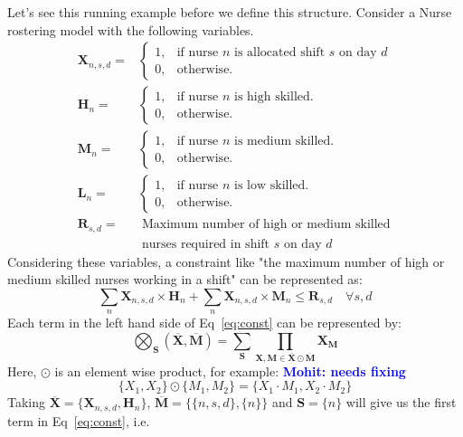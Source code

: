 \documentclass{article}
\newcommand{\mohit}[1]{{\bf \textcolor{blue}{{Mohit: #1}}}}
\newcommand{\TX}{\textbf{X}\xspace}
\newcommand{\TM}{\textbf{M}\xspace}
\begin{document}
Let's see this running example before we define this structure. Consider a Nurse rostering model with the following variables.
%
\begin{align*}
  \TX_{n,s,d} = & \begin{cases}
    1, & \text{if nurse $n$ is allocated shift $s$ on day $d$}\\
    0, & \text{otherwise}.
  \end{cases}\\
  \textbf{H}_{n} = & \begin{cases}
    1, & \text{if nurse $n$ is high skilled}.\\
    0, & \text{otherwise}.
  \end{cases}\\
  \textbf{M}_{n} = & \begin{cases}
    1, & \text{if nurse $n$ is medium skilled}.\\
    0, & \text{otherwise}.
  \end{cases}\\
  \textbf{L}_{n} = & \begin{cases}
    1, & \text{if nurse $n$ is low skilled}.\\
    0, & \text{otherwise}.
  \end{cases}\\
  \textbf{R}_{s,d} =
    & \; \text{Maximum number of high or medium skilled}\\ 
    & \; \text{nurses required in shift $s$ on day $d$}
\end{align*}
%
Considering these variables, a constraint like "the maximum number of high or medium skilled nurses working in a shift" can be represented as:
\begin{equation}
\label{eq:const}
\sum_{n} \TX_{n,s,d} \times \textbf{H}_{n} + \sum_{n} \TX_{n,s,d} \times \textbf{M}_{n} \le \textbf{R}_{s,d} \quad \forall s,d
\end{equation}
Each term in the left hand side of Eq~\ref{eq:const} can be represented by:
\begin{equation}
\label{eq:struct}
	\bigotimes_{\textbf{S}}(\overline{\TX}, \overline{\TM}) = \sum_{\textbf{S}}\prod_{\TX,\TM \in \overline{\TX} \odot \overline{\TM}}\TX_{\TM}
\end{equation}
Here, $\odot$ is an element wise product, for example: {\mohit{needs fixing}}
\begin{equation*}
    \{X_1,X_2\}\odot \{M_1,M_2\}=\{X_1\cdot M_1, X_2 \cdot M_2\}
\end{equation*}
Taking $\overline{\TX}=\{\TX_{n,s,d}, \textbf{H}_{n}\}$, $\overline{\TM}=\{\{n,s,d\}, \{n\}\}$ and $\textbf{S}=\{n\}$ will give us the first term in Eq~\ref{eq:const}, i.e. 
\end{document}
